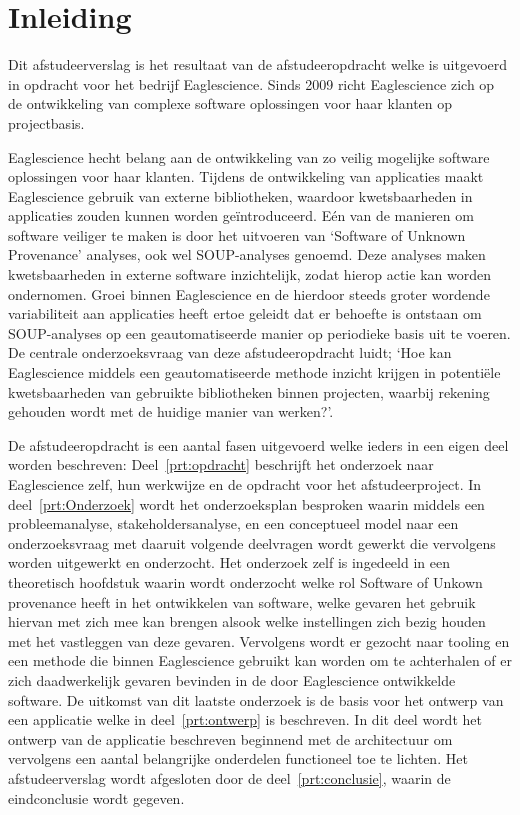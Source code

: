 \chapter{Inleiding}\label{ch:inleiding}
Dit afstudeerverslag is het resultaat van de afstudeeropdracht welke is uitgevoerd in opdracht voor het bedrijf Eaglescience. Sinds 2009 richt Eaglescience zich op de ontwikkeling van complexe software oplossingen voor haar klanten op projectbasis.

Eaglescience hecht belang aan de ontwikkeling van zo veilig mogelijke software oplossingen voor haar klanten. Tijdens de ontwikkeling van applicaties maakt Eaglescience gebruik van externe bibliotheken, waardoor kwetsbaarheden in applicaties zouden kunnen worden geïntroduceerd. Eén van de manieren om software veiliger te maken is door het uitvoeren van ‘Software of Unknown Provenance’ analyses, ook wel SOUP-analyses genoemd. Deze analyses maken kwetsbaarheden in externe software inzichtelijk, zodat hierop actie kan worden ondernomen. Groei binnen Eaglescience en de hierdoor steeds groter wordende variabiliteit aan applicaties heeft ertoe geleidt dat er behoefte is ontstaan om SOUP-analyses op een geautomatiseerde manier op periodieke basis uit te voeren. De centrale onderzoeksvraag van deze afstudeeropdracht luidt; ‘Hoe kan Eaglescience middels een geautomatiseerde methode inzicht krijgen in potentiële kwetsbaarheden van gebruikte bibliotheken binnen projecten, waarbij rekening gehouden wordt met de huidige manier van werken?’.

De afstudeeropdracht is een aantal fasen uitgevoerd welke ieders in een eigen deel worden beschreven:
Deel~\ref{prt:opdracht} beschrijft het onderzoek naar Eaglescience zelf, hun werkwijze en de opdracht voor het afstudeerproject. In deel~\ref{prt:Onderzoek} wordt het onderzoeksplan besproken waarin middels een probleemanalyse, stakeholdersanalyse, en een conceptueel model naar een onderzoeksvraag met daaruit volgende deelvragen wordt gewerkt die vervolgens worden uitgewerkt en onderzocht. Het onderzoek zelf is ingedeeld in een theoretisch hoofdstuk waarin wordt onderzocht welke rol Software of Unkown provenance heeft in het ontwikkelen van software, welke gevaren het gebruik hiervan met zich mee kan brengen alsook welke instellingen zich bezig houden met het vastleggen van deze gevaren. Vervolgens wordt er gezocht naar tooling en een methode die binnen Eaglescience gebruikt kan worden om te achterhalen of er zich daadwerkelijk gevaren bevinden in de door Eaglescience ontwikkelde software. De uitkomst van dit laatste onderzoek is de basis voor het ontwerp van een applicatie welke in deel~\ref{prt:ontwerp} is beschreven. In dit deel wordt het ontwerp van de applicatie beschreven beginnend met de architectuur om vervolgens een aantal belangrijke onderdelen functioneel toe te lichten. Het afstudeerverslag wordt afgesloten door de deel~\ref{prt:conclusie}, waarin de eindconclusie wordt gegeven.


